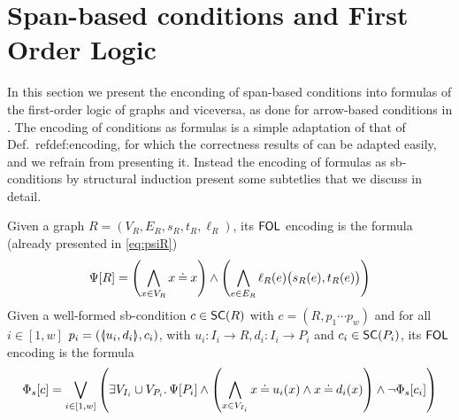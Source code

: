\section{Span-based conditions and First Order Logic}


In this section we present the enconding of span-based conditions into formulas of the first-order logic of graphs and viceversa, as done for arrow-based conditions in . The encoding of conditions as formulas is a simple adaptation of that of Def.~ref{def:encoding}, for which the correctness results of  can be adapted easily, and we refrain from presenting it.
Instead the encoding of formulas as sb-conditions by structural induction present some subtetlies that we discuss in detail. 




\begin{definition}
  \label{def:sb-encoding}
  Given a graph $R = (V_R, E_R, s_R, t_R, \ell_R)$, its $\mathsf{FOL}$ encoding is the formula (already presented in \eqref{eq:psiR})  
\begin{equation}
	\grtofol R = %
\left( \bigwedge_{x\in V_R}{x\Eq x} \right) \wedge
\left( \bigwedge_{e\in E_R} \ell_R(e)\bigl(s_R(e),t_R(e)\bigr) \right) \label{eq:psiR-sb}
\end{equation} 
Given a well-formed sb-condition $c\in \SC R$ with $c=(R,p_1\cdots p_w)$ and for all $i \in [1,w]$ $p_i = (\spanof {u_i} {d_i},{c_i})$, with $u_i: I_i \to R, d_i: I_i \to P_i$ and $c_i \in \SC{P_i}$, its $\mathsf{FOL}$ encoding is the formula 
\begin{align}
	\sbtofol c = %
  \bigvee_{i\in [1,w]} \left(\exists V_{I_i} \cup V_{P_i}\st \grtofol {P_i} \land  \left(\bigwedge_{x \in V_{I_i}} x \Eq u_i(x) \land x \Eq d_i(x)\right) \land  \neg \sbtofol {c_i}\right)\label{eq:phiC}
\end{align}
\end{definition}

